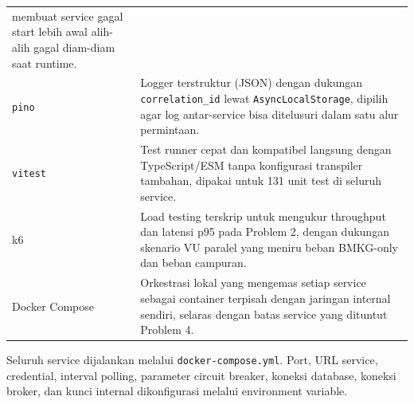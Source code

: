\begin{table}[H]
\begin{tabularx}{\textwidth}{@{}p{}X@{}}
    membuat service gagal start lebih awal alih-alih gagal diam-diam saat
    runtime. \\
    \texttt{pino} & Logger terstruktur (JSON) dengan dukungan
    \texttt{correlation\_id} lewat \texttt{AsyncLocalStorage}, dipilih agar
    log antar-service bisa ditelusuri dalam satu alur permintaan. \\
    \texttt{vitest} & Test runner cepat dan kompatibel langsung dengan
    TypeScript/ESM tanpa konfigurasi transpiler tambahan, dipakai untuk
    131 unit test di seluruh service. \\
    k6 & Load testing terskrip untuk mengukur throughput dan latensi p95
    pada Problem 2, dengan dukungan skenario VU paralel yang meniru beban
    BMKG-only dan beban campuran. \\
    Docker Compose & Orkestrasi lokal yang mengemas setiap service sebagai
    container terpisah dengan jaringan internal sendiri, selaras dengan
    batas service yang dituntut Problem 4. \\
    \bottomrule
  \end{tabularx}
\end{table}

Seluruh service dijalankan melalui \texttt{docker-compose.yml}. Port, URL
service, credential, interval polling, parameter circuit breaker, koneksi
database, koneksi broker, dan kunci internal dikonfigurasi melalui environment
variable.
